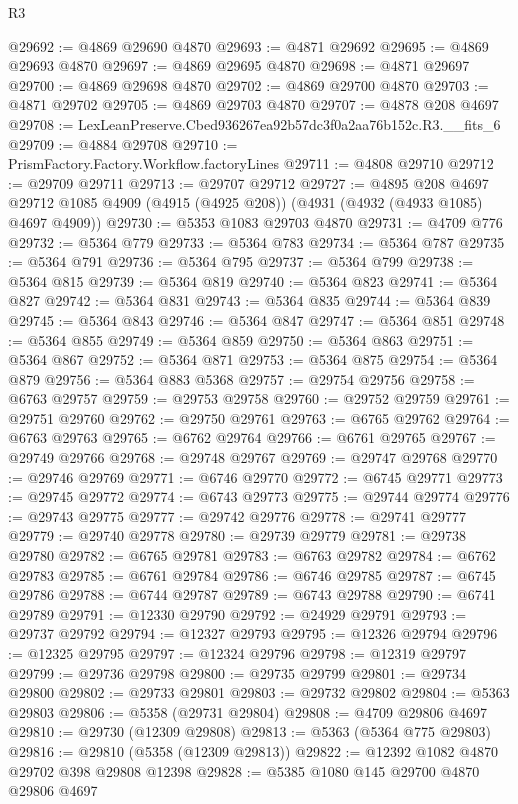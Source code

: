 \begin{lexlean}{R3}
\begin{coremodule}
@29692 := @4869 @29690 @4870
@29693 := @4871 @29692
@29695 := @4869 @29693 @4870
@29697 := @4869 @29695 @4870
@29698 := @4871 @29697
@29700 := @4869 @29698 @4870
@29702 := @4869 @29700 @4870
@29703 := @4871 @29702
@29705 := @4869 @29703 @4870
@29707 := @4878 @208 @4697
@29708 := LexLeanPreserve.Cbed936267ea92b57dc3f0a2aa76b152c.R3.__fits_6
@29709 := @4884 @29708
@29710 := PrismFactory.Factory.Workflow.factoryLines
@29711 := @4808 @29710
@29712 := @29709 @29711
@29713 := @29707 @29712
@29727 := @4895
    @208
    @4697
    @29712
    @1085
    @4909
    (@4915 (@4925 @208))
    (@4931 (@4932 (@4933 @1085) @4697 @4909))
@29730 := @5353 @1083 @29703 @4870
@29731 := @4709 @776
@29732 := @5364 @779
@29733 := @5364 @783
@29734 := @5364 @787
@29735 := @5364 @791
@29736 := @5364 @795
@29737 := @5364 @799
@29738 := @5364 @815
@29739 := @5364 @819
@29740 := @5364 @823
@29741 := @5364 @827
@29742 := @5364 @831
@29743 := @5364 @835
@29744 := @5364 @839
@29745 := @5364 @843
@29746 := @5364 @847
@29747 := @5364 @851
@29748 := @5364 @855
@29749 := @5364 @859
@29750 := @5364 @863
@29751 := @5364 @867
@29752 := @5364 @871
@29753 := @5364 @875
@29754 := @5364 @879
@29756 := @5364 @883 @5368
@29757 := @29754 @29756
@29758 := @6763 @29757
@29759 := @29753 @29758
@29760 := @29752 @29759
@29761 := @29751 @29760
@29762 := @29750 @29761
@29763 := @6765 @29762
@29764 := @6763 @29763
@29765 := @6762 @29764
@29766 := @6761 @29765
@29767 := @29749 @29766
@29768 := @29748 @29767
@29769 := @29747 @29768
@29770 := @29746 @29769
@29771 := @6746 @29770
@29772 := @6745 @29771
@29773 := @29745 @29772
@29774 := @6743 @29773
@29775 := @29744 @29774
@29776 := @29743 @29775
@29777 := @29742 @29776
@29778 := @29741 @29777
@29779 := @29740 @29778
@29780 := @29739 @29779
@29781 := @29738 @29780
@29782 := @6765 @29781
@29783 := @6763 @29782
@29784 := @6762 @29783
@29785 := @6761 @29784
@29786 := @6746 @29785
@29787 := @6745 @29786
@29788 := @6744 @29787
@29789 := @6743 @29788
@29790 := @6741 @29789
@29791 := @12330 @29790
@29792 := @24929 @29791
@29793 := @29737 @29792
@29794 := @12327 @29793
@29795 := @12326 @29794
@29796 := @12325 @29795
@29797 := @12324 @29796
@29798 := @12319 @29797
@29799 := @29736 @29798
@29800 := @29735 @29799
@29801 := @29734 @29800
@29802 := @29733 @29801
@29803 := @29732 @29802
@29804 := @5363 @29803
@29806 := @5358 (@29731 @29804)
@29808 := @4709 @29806 @4697
@29810 := @29730 (@12309 @29808)
@29813 := @5363 (@5364 @775 @29803)
@29816 := @29810 (@5358 (@12309 @29813))
@29822 := @12392 @1082 @4870 @29702 @398 @29808 @12398
@29828 := @5385 @1080 @145 @29700 @4870 @29806 @4697

\end{coremodule}
\end{lexlean}
